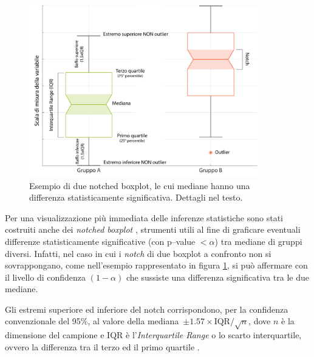 \begin{figure}[h]
    \centering
    \includegraphics[width=0.9\textwidth]{Figure/esempionotch.pdf}
    \caption{Esempio di due notched boxplot, le cui mediane hanno una differenza statisticamente significativa. Dettagli nel testo.}
    \label{fig:notch}
\end{figure}

Per una visualizzazione più immediata delle inferenze statistiche sono stati costruiti anche dei \emph{notched boxplot} \cite{McGill1978}, strumenti utili al fine di graficare eventuali differenze statisticamente significative (con p--value $< \alpha$) tra mediane di gruppi diversi. Infatti, nel caso in cui i \emph{notch} di due boxplot a confronto non si sovrappongano, come nell'esempio rappresentato in figura \ref{fig:notch}, si può affermare con il livello di confidenza $(1-\alpha)$ che sussiste una differenza significativa tra le due mediane. 

Gli estremi superiore ed inferiore del notch corrispondono, per la confidenza convenzionale del 95$\%$, al valore della mediana~$\pm {1.57 \times \mathrm{IQR}}/{\sqrt{n}} $, dove $n$ è la dimensione del campione e $\mathrm{IQR}$ è l'\textsl{Interquartile Range} o lo scarto interquartile, ovvero la differenza tra il terzo ed il primo quartile \cite{McGill1978}.\\



